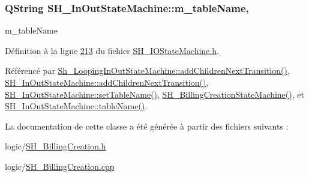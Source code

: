 \hypertarget{classSH__InOutStateMachine_acc0f5d5133af2dcca30939f53ec8837b}{
\subsubsection[{m\-\_\-table\-Name}]{\setlength{\rightskip}{0pt plus 5cm}Q\-String S\-H\-\_\-\-In\-Out\-State\-Machine\-::m\-\_\-table\-Name\hspace{0.3cm}{\ttfamily [protected]}, {\ttfamily [inherited]}}}\label{classSH__InOutStateMachine_acc0f5d5133af2dcca30939f53ec8837b}


m\-\_\-table\-Name 



Définition à la ligne \hyperlink{SH__IOStateMachine_8h_source_l00213}{213} du fichier \hyperlink{SH__IOStateMachine_8h_source}{S\-H\-\_\-\-I\-O\-State\-Machine.\-h}.



Référencé par \hyperlink{classSh__LoopingInOutStateMachine_acfd8d0711c793b13c759f6c50be6a315}{Sh\-\_\-\-Looping\-In\-Out\-State\-Machine\-::add\-Children\-Next\-Transition()}, \hyperlink{classSH__InOutStateMachine_a689e5513ef6ef3fc1598efacd413372e}{S\-H\-\_\-\-In\-Out\-State\-Machine\-::add\-Children\-Next\-Transition()}, \hyperlink{classSH__InOutStateMachine_a437a730d07ddd15bd96314ab0b6cf40e}{S\-H\-\_\-\-In\-Out\-State\-Machine\-::set\-Table\-Name()}, \hyperlink{classSH__BillingCreationStateMachine_ad62b77fa4aeafe200056ff3974562f83}{S\-H\-\_\-\-Billing\-Creation\-State\-Machine()}, et \hyperlink{classSH__InOutStateMachine_a18b07a985695100612bbcbda870933b4}{S\-H\-\_\-\-In\-Out\-State\-Machine\-::table\-Name()}.



La documentation de cette classe a été générée à partir des fichiers suivants \-:\begin{DoxyCompactItemize}
\item 
logic/\hyperlink{SH__BillingCreation_8h}{S\-H\-\_\-\-Billing\-Creation.\-h}\item 
logic/\hyperlink{SH__BillingCreation_8cpp}{S\-H\-\_\-\-Billing\-Creation.\-cpp}\end{DoxyCompactItemize}
